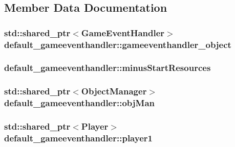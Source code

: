 \subsection{Member Data Documentation}
\hypertarget{classdefault__gameeventhandler_aefeb6dad4999cfc75af77e989043815c}{
\subsubsection[{gameeventhandler\-\_\-object}]{\setlength{\rightskip}{0pt plus 5cm}std\-::shared\-\_\-ptr$<${\bf Game\-Event\-Handler}$>$ default\-\_\-gameeventhandler\-::gameeventhandler\-\_\-object\hspace{0.3cm}{\ttfamily [private]}}}\label{classdefault__gameeventhandler_aefeb6dad4999cfc75af77e989043815c}
\hypertarget{classdefault__gameeventhandler_aa22ed639196433fa97c3c53501660910}{
\subsubsection[{minus\-Start\-Resources}]{ default\-\_\-gameeventhandler\-::minus\-Start\-Resources\hspace{0.3cm}{\ttfamily [private]}}}\label{classdefault__gameeventhandler_aa22ed639196433fa97c3c53501660910}
\hypertarget{classdefault__gameeventhandler_acdd2478cf08de20b164b66ec103b7de1}{
\subsubsection[{obj\-Man}]{\setlength{\rightskip}{0pt plus 5cm}std\-::shared\-\_\-ptr$<${\bf Object\-Manager}$>$ default\-\_\-gameeventhandler\-::obj\-Man\hspace{0.3cm}{\ttfamily [private]}}}\label{classdefault__gameeventhandler_acdd2478cf08de20b164b66ec103b7de1}
\hypertarget{classdefault__gameeventhandler_a25fc82697d08eb776919e8286bd2db5d}{
\subsubsection[{player1}]{\setlength{\rightskip}{0pt plus 5cm}std\-::shared\-\_\-ptr$<${\bf Player}$>$ default\-\_\-gameeventhandler\-::player1\hspace{0.3cm}{\ttfamily [private]}}}\label{classdefault__gameeventhandler_a25fc82697d08eb776919e8286bd2db5d}
